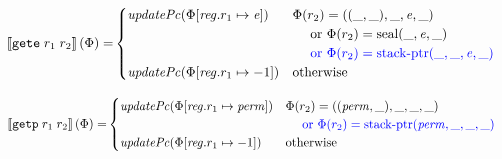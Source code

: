 \documentclass[a4paper]{article}
\begin{document}
\begin{align*}
  \sem{\tgete{r_1}{r_2}}(\Phi) = & 
                                   \begin{cases}
                                     \updPcAddr{\Phi\updReg{r_1}{\eaddr}} & 
                                     \arraycolsep=0pt
                                     \begin{array}[t]{l}
                                       \Phi(r_2) = ((\_,\_),\_,\eaddr,\_) \\
                                       \quad \tor \Phi(r_2) = \seal{\_,\eaddr,\_} \\
                                       \quad \src{\tor \Phi(r_2) = \stkptr{\_,\_,\eaddr,\_} } \\
                                     \end{array} \\
                                     \updPcAddr{\Phi\updReg{r_1}{-1}} & \totherwise
                                   \end{cases}
\end{align*}

\begin{align*}
  \sem{\tgetp{r_1}{r_2}}(\Phi) = & 
                                   \begin{cases}
                                     \updPcAddr{\Phi\updReg{r_1}{\perm}} & 
                                     \arraycolsep=0pt
                                     \begin{array}[t]{l}
                                       \Phi(r_2) = ((\perm,\_),\_,\_,\_) \\
                                       \quad \src{\tor \Phi(r_2) = \stkptr{\perm,\_,\_,\_} } \\
                                     \end{array} \\
                                     \updPcAddr{\Phi\updReg{r_1}{-1}} & \totherwise
                                   \end{cases}
\end{align*}
\end{document}
